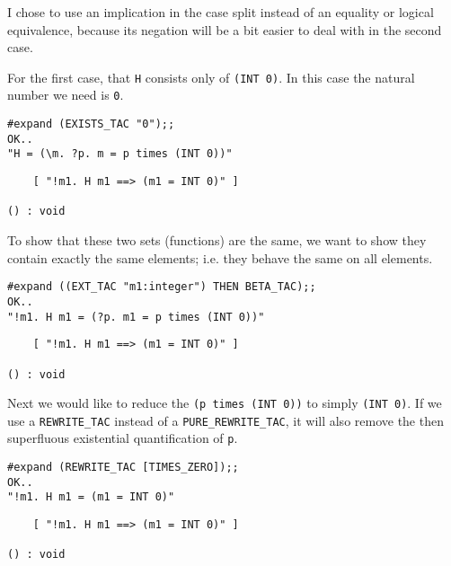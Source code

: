 I chose to use an implication in the case split instead of an
equality or logical equivalence, because its negation will be a bit
easier to deal with in the second case.

For the first case, that {\small\tt H} consists only of
{\small\verb+(INT 0)+}.  In this case the natural number we need is
{\small\tt 0}. 
\begin{session}
\begin{verbatim}
#expand (EXISTS_TAC "0");;
OK..
"H = (\m. ?p. m = p times (INT 0))"
\end{verbatim}
\mvdots
\begin{verbatim}
    [ "!m1. H m1 ==> (m1 = INT 0)" ]

() : void
\end{verbatim}
\end{session}

To show that these two sets (functions) are the same, we want to show
they contain exactly the same elements; i.e. they behave the same on
all elements.
\begin{session}
\begin{verbatim}
#expand ((EXT_TAC "m1:integer") THEN BETA_TAC);;
OK..
"!m1. H m1 = (?p. m1 = p times (INT 0))"
\end{verbatim}
\mvdots
\begin{verbatim}
    [ "!m1. H m1 ==> (m1 = INT 0)" ]

() : void
\end{verbatim}
\evdots
\end{session}

Next we would like to reduce the {\small\verb+(p times (INT 0))+} to
simply {\small\verb+(INT 0)+}.  If we use a {\small\verb+REWRITE_TAC+}
instead of a {\small\verb+PURE_REWRITE_TAC+}, it will also remove the
then superfluous existential quantification of {\small\tt p}.

\begin{session}
\begin{verbatim}
#expand (REWRITE_TAC [TIMES_ZERO]);;
OK..
"!m1. H m1 = (m1 = INT 0)"
\end{verbatim}
\mvdots
\begin{verbatim}
    [ "!m1. H m1 ==> (m1 = INT 0)" ]

() : void
\end{verbatim}
\end{session}

